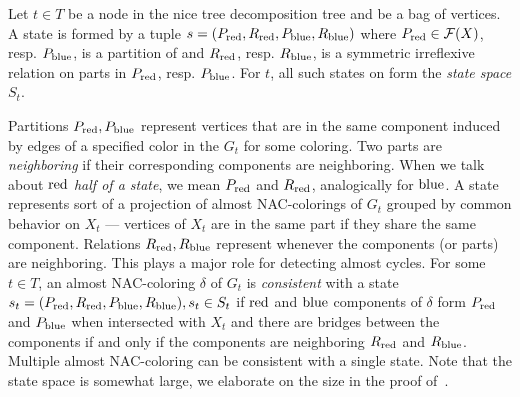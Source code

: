 %
\begin{definition}
	Let \( t \in T \) be a node in the nice tree decomposition tree and
	\Xt{} be a bag of vertices.
	A state is formed by a tuple \( s = (P_{\text{red}}, R_{\text{red}}, P_{\text{blue}}, R_{\text{blue}}) \)
	where \( P_{\text{red}} \in \mathcal{F}(X)\), resp. \( P_{\text{blue}} \), is a partition of \Xt{}
	and \( R_{\text{red}}\), resp. \(R_{\text{blue}} \), is a symmetric irreflexive relation
	on parts in \( P_{\text{red}}\), resp. \(P_{\text{blue}} \).
	For \( t \), all such states on \Xt{} form the \emph{state space} \( S_t \).
\end{definition}
%
Partitions \( P_{\text{red}}, P_{\text{blue}} \) represent vertices
that are in the same component induced by edges of a specified color
in the \( G_t \) for some coloring.
Two parts are \emph{neighboring} if their corresponding components are neighboring.
When we talk about \emph{\( \text{red} \) half of a state},
we mean \( P_{\text{red}} \) and \( R_{\text{red}} \),
analogically for \( \text{blue} \).
%
A state represents sort of a projection of almost NAC-colorings of \( G_t \)
grouped by common behavior on \( X_t \)
--- vertices of \( X_t \) are in the same part if they share the same component.
%
Relations \( R_{\text{red}}, R_{\text{blue}} \) represent
whenever the components (or parts) are neighboring.
This plays a major role for detecting almost cycles.
%
For some \( t \in T \),
an almost NAC-coloring \( \delta \) of \( G_t \)
is \emph{consistent} with a state \( s_t = (P_{\text{red}}, R_{\text{red}}, P_{\text{blue}}, R_{\text{blue}}), s_t \in S_t \)
if \( \text{red} \) and \( \text{blue} \) components of \( \delta \) form \( P_{\text{red}} \) and \( P_{\text{blue}} \)
when intersected with \( X_t \) and
there are bridges between the components if and only if
the components are neighboring \( R_{\text{red}} \) and \( R_{\text{blue}} \).
Multiple almost NAC-coloring can be consistent with a single state.
%
Note that the state space is somewhat large,
we elaborate on the size in the proof of~.

